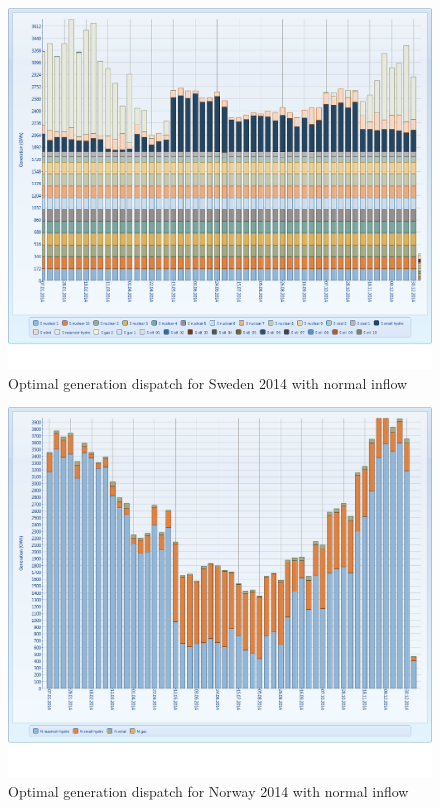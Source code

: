 \documentclass{article}
\begin{document}
\begin{figure}[htbp]
\begin{center}
\includegraphics[width=14cm,keepaspectratio=true]{figures/MTgenerationS}
\caption{Optimal generation dispatch for Sweden 2014 with normal inflow}
\label{fig:MTgenerationSnormal}
\end{center}
\end{figure}
\begin{figure}[htbp]
\begin{center}
\includegraphics[width=14cm,keepaspectratio=true]{figures/MTgenerationN}
\caption{Optimal generation dispatch for Norway 2014 with normal inflow}
\label{fig:MTgenerationNnormal}
\end{center}
\end{figure}
\end{document}
